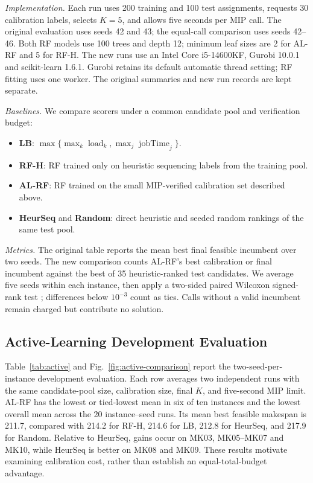 \documentclass[conference]{IEEEtran}
\begin{document}
\textit{Implementation.} Each run uses 200 training and 100 test assignments, requests 30 calibration labels, selects $K=5$, and allows five seconds per MIP call. The original evaluation uses seeds 42 and 43; the equal-call comparison uses seeds 42--46. Both RF models use 100 trees and depth 12; minimum leaf sizes are 2 for AL-RF and 5 for RF-H. The new runs use an Intel Core i5-14600KF, Gurobi 10.0.1 and scikit-learn 1.6.1. Gurobi retains its default automatic thread setting; RF fitting uses one worker. The original summaries and new run records are kept separate.

\textit{Baselines.} We compare scorers under a common candidate pool and verification budget:
\begin{itemize}[leftmargin=1.2em]
\item \textbf{LB}: $\max\{\max_k\operatorname{load}_k,\max_j\operatorname{jobTime}_j\}$.
\item \textbf{RF-H}: RF trained only on heuristic sequencing labels from the training pool.
\item \textbf{AL-RF}: RF trained on the small MIP-verified calibration set described above.
\item \textbf{HeurSeq} and \textbf{Random}: direct heuristic and seeded random rankings of the same test pool.
\end{itemize}

\textit{Metrics.} The original table reports the mean best final feasible incumbent over two seeds. The new comparison counts AL-RF's best calibration or final incumbent against the best of 35 heuristic-ranked test candidates. We average five seeds within each instance, then apply a two-sided paired Wilcoxon signed-rank test \cite{Demsar2006}; differences below $10^{-3}$ count as ties. Calls without a valid incumbent remain charged but contribute no solution.

\subsection{Active-Learning Development Evaluation}
Table~\ref{tab:active} and Fig.~\ref{fig:active-comparison} report the two-seed-per-instance development evaluation. Each row averages two independent runs with the same candidate-pool size, calibration size, final $K$, and five-second MIP limit. AL-RF has the lowest or tied-lowest mean in six of ten instances and the lowest overall mean across the 20 instance--seed runs. Its mean best feasible makespan is 211.7, compared with 214.2 for RF-H, 214.6 for LB, 212.8 for HeurSeq, and 217.9 for Random. Relative to HeurSeq, gains occur on MK03, MK05--MK07 and MK10, while HeurSeq is better on MK08 and MK09. These results motivate examining calibration cost, rather than establish an equal-total-budget advantage.
\end{document}
